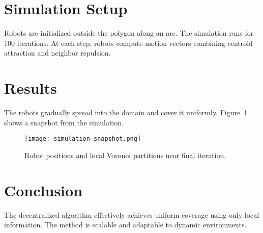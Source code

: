 \documentclass[11pt]{article}
\begin{document}
\section{Simulation Setup}
Robots are initialized outside the polygon along an arc. The simulation runs for 100 iterations. At each step, robots compute motion vectors combining centroid attraction and neighbor repulsion.

\section{Results}
The robots gradually spread into the domain and cover it uniformly. Figure~\ref{fig:result} shows a snapshot from the simulation.

\begin{figure}[h]
\centering
\texttt{[image: simulation\_snapshot.png]}
\caption{Robot positions and local Voronoi partitions near final iteration.}
\label{fig:result}
\end{figure}

\section{Conclusion}
The decentralized algorithm effectively achieves uniform coverage using only local information. The method is scalable and adaptable to dynamic environments.
\end{document}
